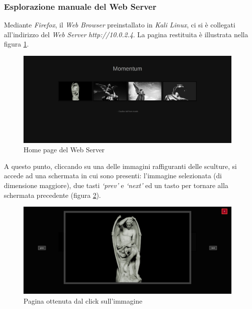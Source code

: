\subsubsection{Esplorazione manuale del Web Server}
Mediante \emph{Firefox}, il \emph{Web Browser} preinstallato in \emph{Kali Linux}, ci si è collegati all'indirizzo del \emph{Web Server} \emph{http://10.0.2.4}. La pagina restituita è illustrata nella figura \ref{fig:index}.
\begin{figure}[h]
    \centering
    \includegraphics[scale=0.3]{capitoli/images/index.png}
    \caption{Home page del Web Server}
    \label{fig:index}
\end{figure}

A questo punto, cliccando su una delle immagini raffiguranti delle sculture, si accede ad una schermata in cui sono presenti: l'immagine selezionata (di dimensione maggiore), due tasti \emph{`prev'} e \emph{`next'} ed un tasto per tornare alla schermata precedente (figura \ref{fig:click}).
\begin{figure}[h]
    \centering
    \includegraphics[scale=0.3]{capitoli/images/click.png}
    \caption{Pagina ottenuta dal click sull'immagine}
    \label{fig:click}
\end{figure}

